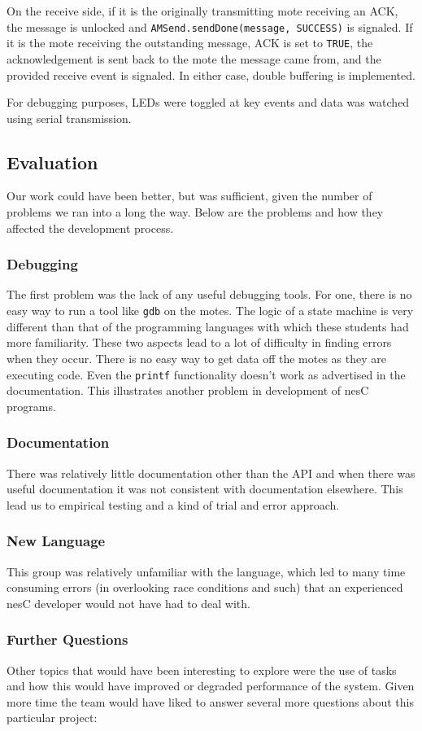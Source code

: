 \documentclass{sig-alternate}
\begin{document}
On the receive side, if it is the originally transmitting mote receiving an ACK, the message is unlocked and \texttt{AMSend.sendDone(message, SUCCESS)} is signaled. If it is the mote receiving the outstanding message, ACK is set to \texttt{TRUE}, the acknowledgement is sent back to the mote the message came from, and the provided receive event is signaled.  In either case, double buffering is implemented.

For debugging purposes, LEDs were toggled at key events and data was watched using serial transmission.

\subsection{Evaluation}\label{eval}
Our work could have been better, but was sufficient, given the number of problems we ran into a long the way. Below are the problems and how they affected the development process. 
\subsubsection*{Debugging}
The first problem was the lack of any useful debugging tools. For one, there is no easy way to run a tool like \texttt{gdb} on the motes. The logic of a state machine is very different than that of the programming languages with which these students had more familiarity. These two aspects lead to a lot of difficulty in finding errors when they occur. There is no easy way to get data off the motes as they are executing code. Even the \texttt{printf} functionality doesn't work as advertised in the documentation. This illustrates another problem in development of nesC programs.
\subsubsection*{Documentation}
There was relatively little documentation other than the API and when there was useful documentation it was not consistent with documentation elsewhere. This lead us to empirical testing and a kind of trial and error approach.
\subsubsection*{New Language}
This group was relatively unfamiliar with the language, which led to many time consuming errors (in overlooking race conditions and such) that an experienced nesC developer would not have had to deal with.

\subsubsection*{Further Questions}
Other topics that would have been interesting to explore were the use of tasks and how this would have improved or degraded performance of the system. Given more time the team would have liked to answer several more questions about this particular project: 
\end{document}
